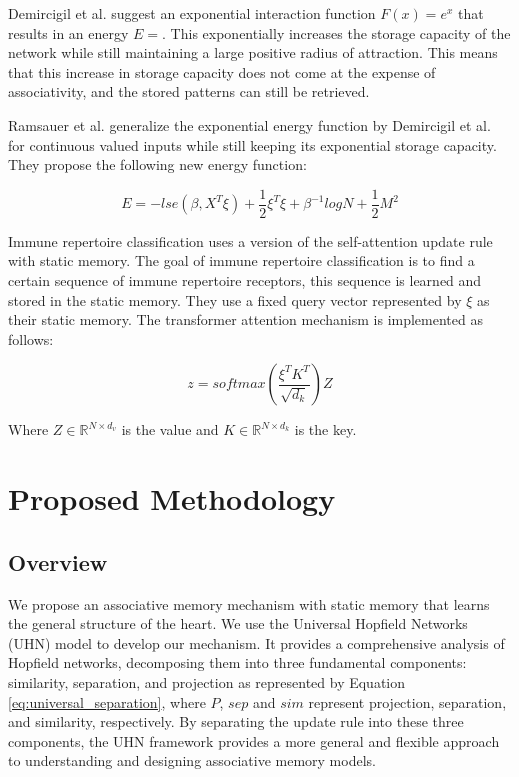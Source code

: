 \documentclass[preprint,12pt]{elsarticle}
\begin{document}
Demircigil et al. \cite{exponential_Demircigil} suggest an exponential interaction function $F(x) = e^x$ that results in an energy $E = $. This exponentially increases the storage capacity of the network while still maintaining a large positive radius of attraction. This means that this increase in storage capacity does not come at the expense of associativity, and the stored patterns can still be retrieved.


Ramsauer et al. \cite{SA_update} generalize the exponential energy function by Demircigil et al. \cite{exponential_Demircigil} for continuous valued inputs while still keeping its exponential storage capacity. They propose the following new energy function: 

\begin{equation}
    E = -lse(\beta, X^T\xi) + \frac{1}{2}\xi^T\xi + \beta^{-1}logN + \frac{1}{2}M^2
    \label{eq:continous_energy}
\end{equation}



Immune repertoire classification \cite{DeepRC} uses a version of the self-attention update rule with static memory. The goal of immune repertoire classification is to find a certain sequence of immune repertoire receptors, this sequence is learned and stored in the static memory. They use a fixed query vector represented by $\xi$ as their static memory. The transformer attention mechanism is implemented as follows:

\begin{equation}
    z = softmax \left(\frac{\xi^TK^T}{\sqrt{d_k}}\right)Z
    \label{eq:DeepRC_update}
\end{equation}

Where $Z \in \mathbb{R}^{N\times d_v}$ is the value and $K \in \mathbb{R}^{N\times d_k}$ is the key.

\section{Proposed Methodology} 
\subsection{Overview}
We propose an associative memory mechanism with static memory that learns the general structure of the heart. We use the Universal Hopfield Networks (UHN) \cite{universal_networks} model to develop our mechanism. It provides a comprehensive analysis of Hopfield networks, decomposing them into three fundamental components: similarity, separation, and projection as represented by Equation \ref{eq:universal_separation}, where $P$, $sep$ and $sim$ represent projection, separation, and similarity, respectively. By separating the update rule into these three components, the UHN framework provides a more general and flexible approach to understanding and designing associative memory models.
\end{document}
